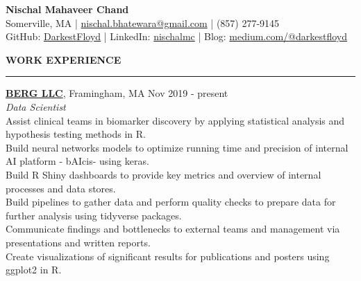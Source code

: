 \documentclass[a4paper]{article}
\newcommand{\myline}{\par
  \kern2pt %
  \hrule height 0.5pt
  \kern2pt %
}
\newcommand{\mybullet}{
	\indent 
  \textbullet \hspace*{2mm}
}
\begin{document}
	\begin{center}
		{\LARGE \textbf{Nischal Mahaveer Chand}} \\
    Somerville, MA | 
    \href{mailto:nischal.bhatewara@gmail.com}{nischal.bhatewara@gmail.com} | 
    (857) 277-9145 \\
                GitHub: \href{https://github.com/darkestfloyd}{DarkestFloyd} | 
                LinkedIn: \href{https://www.linkedin.com/in/nischalmc}{nischalmc} |
		Blog: \href{https://medium.com/@darkestfloyd}{medium.com/@darkestfloyd} \\
	\end{center}
	


	\smallskip
	\smallskip
	\noindent
	{\large \textbf{WORK EXPERIENCE}}
	\myline 
	\smallskip
	
  \noindent
  \textbf{\href{https://www.berghealth.com/}{BERG LLC}}, Framingham, MA
  \hfill Nov 2019 - present \\
  \textit{Data Scientist} \\
  \mybullet Assist clinical teams in biomarker discovery by applying statistical analysis and hypothesis testing methods in R. \\
  \mybullet Build neural networks models to optimize running time and precision of internal AI platform - bAIcis\textregistered - using keras. \\
  \mybullet Build R Shiny dashboards to provide key metrics and overview of internal processes and data stores. \\
  \mybullet Build pipelines to gather data and perform quality checks to prepare data for further analysis using tidyverse packages. \\
  \mybullet Communicate findings and bottlenecks to external teams and management via presentations and written reports. \\
  \mybullet Create visualizations of significant results for publications and posters using ggplot2 in R. \\
\end{document}
